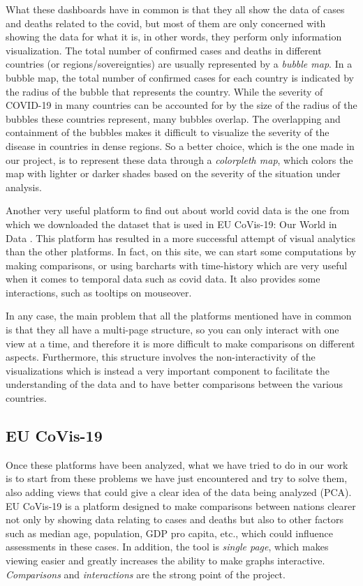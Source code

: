 \documentclass[10pt,conference]{IEEEtran}
\begin{document}
What these dashboards have in common is that they all show the data of cases and deaths related to the covid, but most of them are only 
concerned with showing the data for what it is, in other words, they perform only information visualization.
The total number of confirmed cases and deaths in different countries (or regions/sovereignties) are usually represented by a {\em bubble map}. 
In a bubble map, the total number of confirmed cases for each country is indicated by the radius of the bubble that represents the country. 
While the severity of COVID-19 in many countries can be accounted for by the size of the radius of the bubbles these countries represent, 
many bubbles overlap. The overlapping and containment of the bubbles makes it difficult to visualize the severity of the disease 
in countries in dense regions.
So a better choice, which is the one made in our project, is to represent these data through a {\em colorpleth map}, which colors the 
map with lighter or darker shades based on the severity of the situation under analysis.

Another very useful platform to find out about world covid data is the one from which we downloaded the dataset that is used in 
EU CoVis-19: Our World in Data \cite{vis9}. This platform has resulted in a more successful attempt of visual analytics than the other platforms. 
In fact, on this site, we can start some computations by making comparisons, or using barcharts with time-history which are very useful 
when it comes to temporal data such as covid data. It also provides some interactions, such as tooltips on mouseover. 

In any case, the main problem that all the platforms mentioned have in common is that they all have a multi-page structure, so you 
can only interact with one view at a time, and therefore it is more difficult to make comparisons on different aspects. Furthermore, 
this structure involves the non-interactivity of the visualizations which is instead a very important component to facilitate the 
understanding of the data and to have better comparisons between the various countries.

\subsection{EU CoVis-19}
Once these platforms have been analyzed, what we have tried to do in our work is to start from these problems we have just encountered 
and try to solve them, also adding views that could give a clear idea of the data being analyzed (PCA). EU CoVis-19 is a platform 
designed to make comparisons between nations clearer not only by showing data relating to cases and deaths but also to other factors 
such as median age, population, GDP pro capita, etc., which could influence assessments in these cases. In addition, the tool is 
{\em single page}, which makes viewing easier and greatly increases the ability to make graphs interactive. {\em Comparisons} and {\em interactions} are 
the strong point of the project.
\end{document}
